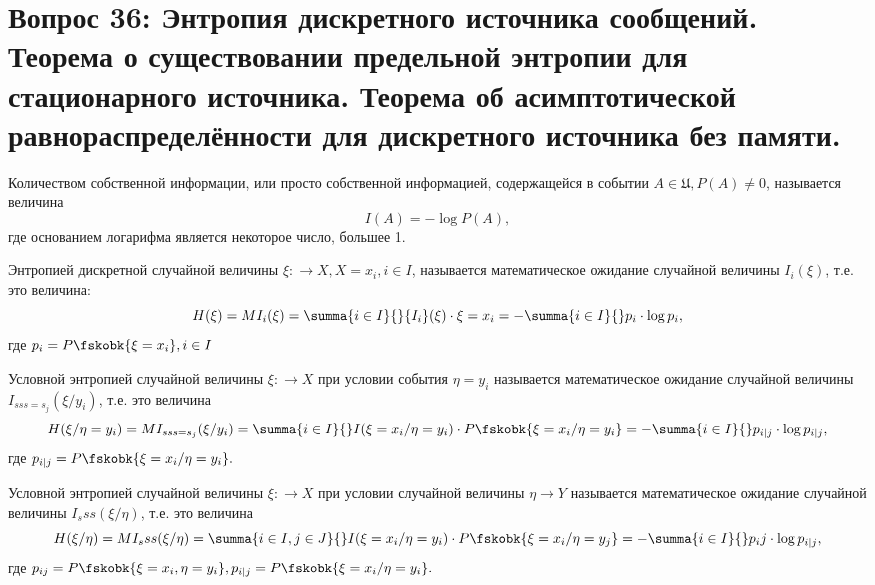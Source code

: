 \section{Вопрос 36:
Энтропия дискретного источника сообщений. Теорема о существовании предельной энтропии для стационарного источника. 
Теорема об асимптотической равнораспределённости для дискретного источника без памяти.
}

\begin{defs}
  Количеством собственной информации, или просто собственной информацией, содержащейся в событии $A \in \mathfrak{U}, P(A ) \neq 0$, называется величина
$${I}(A) = -\log{P(A)},$$
где основанием логарифма является некоторое число, большее 1.
\end{defs}

\begin{defs}[Энтропия]
  Энтропией дискретной случайной величины $\xi: \to X, X = {x_i, i \in I}$, называется математическое ожидание случайной величины $I_i(\xi)$, т.е. это величина:
$$H(\xi) = M{I_i}(\xi) = \summa{i \in I}{}{I_i}(\xi) \cdot {\xi = x_i} = -\summa{i \in I}{}p_i \cdot \log{p_i},$$
где $p_i = P \fskobk{\xi = x_i}, i \in I$ 
\end{defs}

\begin{defs}
Условной энтропией случайной величины $\xi: \to X$ при условии события ${\eta = y_i}$ называется математическое ожидание случайной величины ${I_{sss=s_j}}(\xi/y_i)$,
т.е. это величина
$$H(\xi/\eta = y_i) = M I_{sss=s_j}(\xi/y_i) = \summa{i \in I}{} I(\xi = x_i/ \eta = y_i) \cdot P \fskobk{\xi = x_i/ \eta = y_i} = -\summa{i \in I}{} p_{i|j} \cdot \log{p_{i|j}},$$
где $p_{i|j} = P \fskobk{\xi = x_i/ \eta = y_i}.$
\end{defs}

\begin{defs}
Условной энтропией случайной величины $\xi: \to X$ при условии случайной величины ${\eta \to Y}$ называется математическое ожидание случайной величины ${I_sss}(\xi/\eta)$,
т.е. это величина
$$H(\xi/\eta) = M{I_sss}(\xi/\eta) = \summa{i \in I, j \in J}{} I(\xi = x_i/ \eta = y_i) \cdot P\fskobk{\xi = x_i/ \eta = y_j} = -\summa{i \in I}{} p_ij \cdot \log{p_{i|j}},$$
где $p_{ij} = P \fskobk{\xi = x_i, \eta = y_i}, p_{i|j} = P\fskobk{\xi = x_i/ \eta = y_i}.$
\end{defs}

